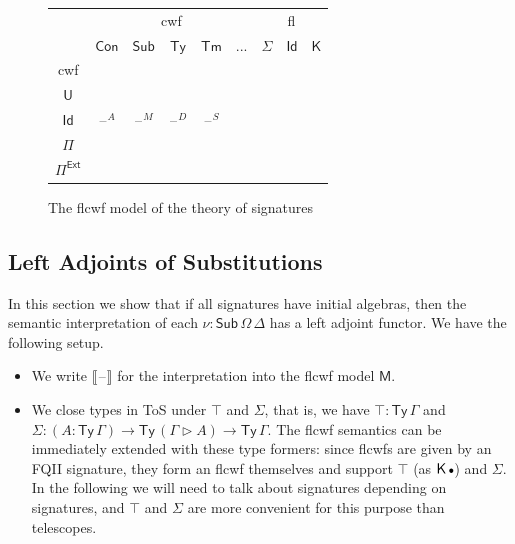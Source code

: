 \documentclass[12pt,a4paper,twoside,openany]{book}
\theoremstyle{remark}
\theoremstyle{definition}
\theoremstyle{theorem}
\newcommand{\bs}[1]{\boldsymbol{#1}}
\newcommand{\Con}{\mathsf{Con}}
\newcommand{\Sub}{\mathsf{Sub}}
\newcommand{\Tm}{\mathsf{Tm}}
\newcommand{\Ty}{\mathsf{Ty}}
\newcommand{\U}{\mathsf{U}}
\newcommand{\Id}{\mathsf{Id}}
\newcommand{\blank}{\mathord{\hspace{1pt}\text{--}\hspace{1pt}}}
\newcommand{\ext}{\triangleright}
\newcommand{\emptycon}{\scaleobj{.75}\bullet}
\newcommand{\Pie}{\Pi^{\mathsf{Ext}}}
\newcommand{\K}{\mathsf{K}}
\newcommand{\bM}{\bs{\mathsf{M}}}
\newcommand{\llb}{\llbracket}
\newcommand{\rrb}{\rrbracket}
\begin{document}
\begin{figure}
\begin{center}
\begin{tabular}{ |c|c|c|c|c|c|c|c|c|  }
 \hline
   & \multicolumn{5}{|c|}{cwf} & \multicolumn{3}{c|}{fl}\\
 \cline{2-9}
   & $\Con$ & $\Sub$ & $\Ty$ & $\Tm$ & $...$ & $\Sigma$ & $\Id$ & $\K$ \\
 \hline
   cwf    & \multirow{5}{2em}{$\blank^A$}&\multirow{5}{2em}{$\blank^M$}&\multirow{5}{2em}{$\blank^D$}&\multirow{5}{2em}{$\blank^S$}& & & & \\
   $\U$   &                              &              &                  &    & & & & \\
   $\Id$  &                              &              &                  &    & & & & \\
   $\Pi$  &                              &              &                  &    & & & & \\
   $\Pie$ &                              &              &                  &    & & & & \\
 \hline
\end{tabular}
\end{center}
\caption{The flcwf model of the theory of signatures}
\label{fig:fqiit-model}
\end{figure}

\subsection{Left Adjoints of Substitutions}
\label{sec:fqii-left-adjoint}

In this section we show that if all signatures have initial algebras, then the
semantic interpretation of each $\nu : \Sub\,\Omega\,\Delta$ has a left adjoint
functor. We have the following setup.
\begin{itemize}
  \item
  We write $\llb\blank\rrb$ for the interpretation into the flcwf model $\bM$.
  \item
  We close types in ToS under $\top$ and $\Sigma$, that is, we have $\top :
  \Ty\,\Gamma$ and $\Sigma : (A : \Ty\,\Gamma) \to \Ty\,(\Gamma \ext A) \to
  \Ty\,\Gamma$. The flcwf semantics can be immediately extended with these type
  formers: since flcwfs are given by an FQII signature, they form an flcwf
  themselves and support $\top$ (as $\K\,\emptycon$) and $\Sigma$. In the
  following we will need to talk about signatures depending on signatures, and
  $\top$ and $\Sigma$ are more convenient for this purpose than telescopes.
\end{itemize}
\end{document}
